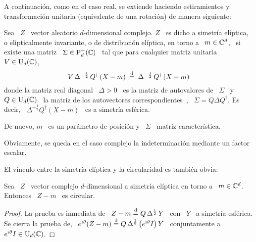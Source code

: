 A continuaci\'on,  como en  el caso real,  se extiende haciendo  estiramientos y
transformaci\'on unitaria (equivalente de una rotaci\'on) de manera siguiente:
%
\begin{definicion}\label{Def:MP:ElipticoComplejo}
  Sea  \ $Z$  \ vector  aleatorio $d$-dimensional  complejo.  $Z$  \ es  dicho a
  simetr\'ia  el\'iptica,   o  elipticalmente  invariante,   o  de  distribuci\'on
  el\'iptica, en torno a \ $m \in  \mathbb{C}^d$, \ si existe una matriz \ $\Sigma \in
  \mathrm{P}_d^+(\mathbb{C})$ \ tal que para cualquier matriz unitaria \ $V \in \mathrm{U}_d(\mathbb{C})$,
  \[
  V  \,   \Delta^{-\frac12}  \,  Q^\dag  \left(   X  -  m  \right)   \:  \stackrel{\mathrm{d}}{=}  \:
  \Delta^{-\frac12} \, Q^\dag \left( X - m \right)
  \]
  donde la matriz real diagonal \ $\Delta  > 0$ \ es la matriz de autovalores de
  \  $\Sigma$  \ y  \  $Q  \in \mathrm{U}_d(\mathbb{C})$  \  la  matriz  de los  autovectores
  correspondientes~\cite{Bha97,   Bha07,  HorJoh13},  \   $\Sigma  =   Q  \Delta
  Q^\dag$. Es  decir, \ $\Delta^{-\frac12} Q^\dag \left(  X - m \right)$  \ es a
  simetr\'ia esf\'erica.

  De  nuevo, $m$  \  es  un par\'ametro  de  posici\'on y  \  $\Sigma$ \  matriz
  caracter\'istica.
\end{definicion}
%
Obviamente, se queda en el caso complejo la indeterminaci\'on mediante un factor
escalar.

El v\'inculo entre la simetr\'ia el\'iptica y la circularidad es tambi\'en obvia:
%
\begin{lema}
  Sea \ $Z$ \ vector complejo  $d$-dimensional a simetr\'ia el\'iptica en torno a
  \ $m \in \mathbb{C}^d$. Entonces \ $Z-m$ \ es circular.
\end{lema}
%
\begin{proof}
  La prueba es  inmediata de \ $Z-m \stackrel{\mathrm{d}}{=}  Q \, \Delta^{\frac12} \, Y$  \ con \
  $Y$ \  a simetr\'ia  esf\'erica. Se  cierra la prueba  de, \  $e^{\imath \theta}
  (Z-m) \stackrel{\mathrm{d}}{=} Q \, \Delta^{\frac12} \,  \big( e^{\imath \theta} I \big) \, Y$ \
  conjuntamente a \ $e^{\imath \theta} I \in \mathrm{U}_d(\mathbb{C})$.
\end{proof}

